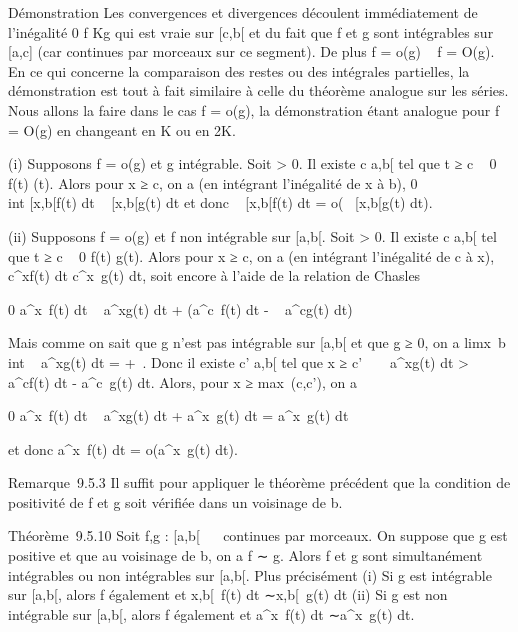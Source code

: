 Démonstration Les convergences et divergences découlent immédiatement de
l'inégalité 0 \leq f \leq Kg qui est vraie sur {[}c,b{[} et du fait que f et g
sont intégrables sur {[}a,c{]} (car continues par morceaux sur ce
segment). De plus f = o(g) \rigtharrow~ f = O(g). En ce qui concerne la comparaison
des restes ou des intégrales partielles, la démonstration est tout à
fait similaire à celle du théorème analogue sur les séries. Nous allons
la faire dans le cas f = o(g), la démonstration étant analogue pour f =
O(g) en changeant \epsilon en K ou en 2K.

(i) Supposons f = o(g) et g intégrable. Soit \epsilon \textgreater{} 0. Il
existe c \in {[}a,b{[} tel que t ≥ c \rigtharrow~ 0 \leq f(t) \leq \epsilong(t). Alors pour x ≥ c,
on a (en intégrant l'inégalité de x à b), 0 \leq\\int
 {[}x,b{[}f(t) dt \leq \epsilon\int ~
{[}x,b{[}g(t) dt et donc \int ~
{[}x,b{[}f(t) dt = o(\int ~
{[}x,b{[}g(t) dt).

(ii) Supposons f = o(g) et f non intégrable sur {[}a,b{[}. Soit \epsilon
\textgreater{} 0. Il existe c \in {[}a,b{[} tel que t ≥ c \rigtharrow~ 0 \leq f(t) \leq \epsilon
{} g(t). Alors pour x ≥ c, on a (en intégrant
l'inégalité de c à x), \int ~
c^xf(t) dt \leq \epsilon {}
\int  c^x~g(t) dt, soit encore à
l'aide de la relation de Chasles

0 \leq\int  a^x~f(t) dt \leq \epsilon
{} \int ~
a^xg(t) dt + \left
(\int  a^c~f(t) dt - \epsilon
{} \int ~
a^cg(t) dt\right )

Mais comme on sait que g n'est pas intégrable sur {[}a,b{[} et que g ≥
0, on a
limx\rightarrow~b\\int ~
a^xg(t) dt = +\infty~. Donc il existe c' \in {[}a,b{[} tel que x
≥ c' \rigtharrow~ \epsilon {} \int ~
a^xg(t) dt \textgreater{}\int ~
a^cf(t) dt - \epsilon {}
\int  a^c~g(t) dt. Alors, pour x
≥ max~(c,c'), on a

0 \leq\int  a^x~f(t) dt \leq \epsilon
{} \int ~
a^xg(t) dt + \epsilon {}
\int  a^x~g(t) dt =
\epsilon\int  a^x~g(t) dt

et donc \int  a^x~f(t) dt =
o(\int  a^x~g(t) dt).

Remarque~9.5.3 Il suffit pour appliquer le théorème précédent que la
condition de positivité de f et g soit vérifiée dans un voisinage de b.

Théorème~9.5.10 Soit f,g : {[}a,b{[}\rightarrow~ ~ continues par morceaux. On
suppose que g est positive et que au voisinage de b, on a f ∼ g. Alors f
et g sont simultanément intégrables ou non intégrables sur {[}a,b{[}.
Plus précisément (i) Si g est intégrable sur {[}a,b{[}, alors f
également et \int  {[}x,b{[}~f(t) dt
∼\int  {[}x,b{[}~g(t) dt (ii) Si g est
non intégrable sur {[}a,b{[}, alors f également et
\int  a^x~f(t) dt
∼\int  a^x~g(t) dt.

